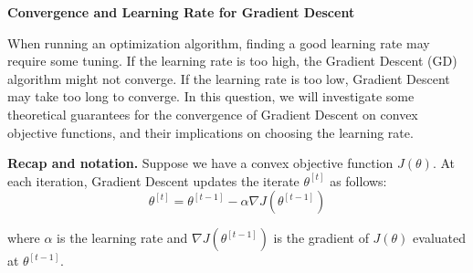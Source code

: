\item {}	{\bf Convergence and Learning Rate for Gradient Descent}

When running an optimization algorithm, finding a good learning rate may require some tuning. 
If the learning rate is too high, the Gradient Descent (GD) algorithm might not converge. If the learning rate is too low, Gradient Descent may take too long to converge.
In this question, we will investigate some theoretical guarantees for the convergence of Gradient Descent on convex objective functions, and their implications on choosing the learning rate.

{\bf Recap and notation.} Suppose we have a convex
objective function $J(\theta)$. At each iteration, Gradient Descent updates the iterate $\theta^{[t]}$ as 
follows:
\begin{equation*}
	\theta^{[t]} = \theta^{[t-1]} - \alpha\nabla J(\theta^{[t-1]})
\end{equation*}

where $\alpha$ is the learning rate and $\nabla J(\theta^{[t-1]})$ is the gradient of $J(\theta)$ evaluated at $\theta^{[t-1]}$.

\begin{enumerate}


\ifnum{}\fi



\ifnum{}\fi



\ifnum{}\fi



\ifnum{}\fi



\ifnum{}\fi



\end{enumerate}